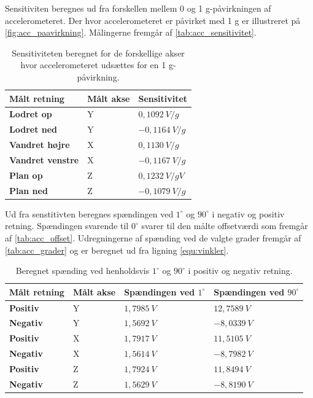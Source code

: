 Sensitiviten beregnes ud fra forskellen mellem 0 og 1 g-påvirkningen af accelerometeret. Der hvor accelerometeret er påvirket med 1 g er illustreret på \autoref{fig:acc_paavirkning}. Målingerne fremgår af \autoref{tab:acc_sensitivitet}. 

\begin{table}[H]
	\centering
	\begin{tabular}{|l|l|l|}
	\textbf{Målt retning} & \textbf{Målt akse} & \textbf{Sensitivitet} \\ \hline
    \textbf{Lodret op} 		& Y		& $0,1092~V/g$ 	\\ \hline
    \textbf{Lodret ned}		& Y 		& $-0,1164~V/g$ 	\\ \hline
    \textbf{Vandret højre} 	& X 		& $0,1130~V/g$     \\ \hline     
    \textbf{Vandret venstre}	& X 		& $-0,1167~V/g$ 	\\ \hline
    \textbf{Plan op} 		& Z 		& $0,1232~V/gV$    	\\ \hline		
    \textbf{Plan ned} 		& Z 		& $-0,1079~V/g$		\\ \hline
	\end{tabular}
	\caption{Sensitiviteten beregnet for de forskellige akser hvor accelerometeret udsættes for en 1 g-påvirkning.}
	\label{tab:acc_sensitivitet}
\end{table}

Ud fra senstitivten beregnes spændingen ved $1^{\circ}$ og $90^{\circ}$ i negativ og positiv retning. Spændingen svarende til $0^{\circ}$ svarer til den målte offsetværdi som fremgår af \autoref{tab:acc_offset}. Udregningerne af spænding ved de valgte grader fremgår af \autoref{tab:acc_grader} og er beregnet ud fra ligning \autoref{equ:vinkler}.

 \begin{table}[H]
	\centering
	\begin{tabular}{|l|l|l|l|}
	\textbf{Målt retning} & \textbf{Målt akse} & \textbf{Spændingen ved $1^{\circ}$} & \textbf{Spændingen ved $90^{\circ}$} \\ \hline
    \textbf{Positiv} 	& Y		& $1,7985~V$   	&	$12,7589~V$\\ \hline
    \textbf{Negativ}		& Y		& $1,5692~V$  	&	$-8,0339~V$\\ \hline
    \textbf{Positiv} 	& X 		& $1,7917~V$   	& 	$11,5105~V$ \\ \hline     
    \textbf{Negativ}		& X 		& $1,5614~V$		&	$-8,7982~V$\\ \hline
    \textbf{Positiv} 	& Z 		& $1,7924~V$   	& 	$11,8494~V$	\\ \hline		
    \textbf{Negativ} 	& Z 		& $1,5629~V$		&	$-8,8190~V$ \\ \hline
	\end{tabular}
	\caption{Beregnet spænding ved henholdsvis $1^{\circ}$ og $90^{\circ}$ i positiv og negativ retning.}
	\label{tab:acc_grader}
\end{table}





